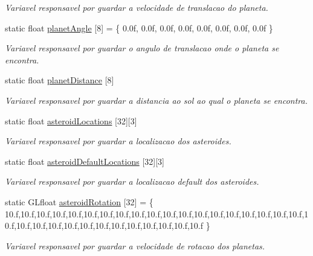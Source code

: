 \begin{DoxyCompactItemize}
\begin{DoxyCompactList}\small\item\em Variavel responsavel por guardar a velocidade de translacao do planeta. \end{DoxyCompactList}\item 
static float \mbox{\hyperlink{class_scene_texture_ae804a3bbd5b89796760b7d6723b42558}{planet\+Angle}} \mbox{[}8\mbox{]} = \{ 0.\+0f, 0.\+0f, 0.\+0f, 0.\+0f, 0.\+0f, 0.\+0f, 0.\+0f, 0.\+0f \}
\begin{DoxyCompactList}\small\item\em Variavel responsavel por guardar o angulo de translacao onde o planeta se encontra. \end{DoxyCompactList}\item 
static float \mbox{\hyperlink{class_scene_texture_a21b953bda09366aa9c43d2da0f4e55fc}{planet\+Distance}} \mbox{[}8\mbox{]}
\begin{DoxyCompactList}\small\item\em Variavel responsavel por guardar a distancia ao sol ao qual o planeta se encontra. \end{DoxyCompactList}\item 
static float \mbox{\hyperlink{class_scene_texture_a626f618c6ec872833e7ed8d7ba3b8dc2}{asteroid\+Locations}} \mbox{[}32\mbox{]}\mbox{[}3\mbox{]}
\begin{DoxyCompactList}\small\item\em Variavel responsavel por guardar a localizacao dos asteroides. \end{DoxyCompactList}\item 
static float \mbox{\hyperlink{class_scene_texture_a7f1a27f3c44ee4c17d0394f37255cd46}{asteroid\+Default\+Locations}} \mbox{[}32\mbox{]}\mbox{[}3\mbox{]}
\begin{DoxyCompactList}\small\item\em Variavel responsavel por guardar a localizacao default dos asteroides. \end{DoxyCompactList}\item 
static G\+Lfloat \mbox{\hyperlink{class_scene_texture_acd91229942db42f5d356451edc2bd2da}{asteroid\+Rotation}} \mbox{[}32\mbox{]} = \{ 10.f,10.f,10.f,10.f,10.f,10.f,10.f,10.f,10.f,10.f,10.f,10.f,10.f,10.f,10.f,10.f,10.f,10.f,10.f,10.f,10.f,10.f,10.f,10.f,10.f,10.f,10.f,10.f,10.f,10.f,10.f,10.f \}
\begin{DoxyCompactList}\small\item\em Variavel responsavel por guardar a velocidade de rotacao dos planetas. \end{DoxyCompactList}\item 

\end{DoxyCompactItemize}

